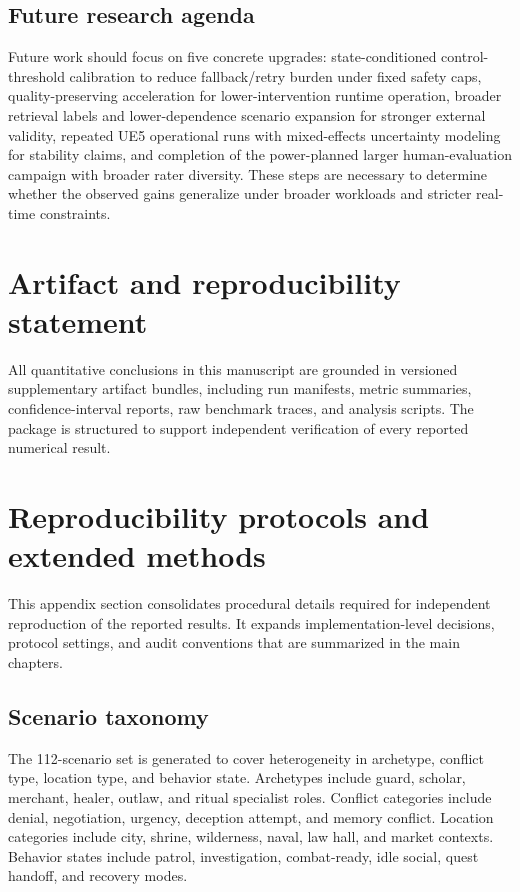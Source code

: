 ﻿\documentclass[a4paper,12pt]{article}
\renewcommand{\thesection}{\arabic{section}}
\begin{document}
\subsection{Future research agenda}
Future work should focus on five concrete upgrades: state-conditioned control-threshold calibration to reduce fallback/retry burden under fixed safety caps, quality-preserving acceleration for lower-intervention runtime operation, broader retrieval labels and lower-dependence scenario expansion for stronger external validity, repeated UE5 operational runs with mixed-effects uncertainty modeling for stability claims, and completion of the power-planned larger human-evaluation campaign with broader rater diversity. These steps are necessary to determine whether the observed gains generalize under broader workloads and stricter real-time constraints.

\section*{Artifact and reproducibility statement}
All quantitative conclusions in this manuscript are grounded in versioned supplementary artifact bundles, including run manifests, metric summaries, confidence-interval reports, raw benchmark traces, and analysis scripts. The package is structured to support independent verification of every reported numerical result.

\appendix
\titleformat{\section}{\bfseries\fontsize{15}{20}\selectfont}{Appendix \thesection:}{0.6em}{}

\section{Reproducibility protocols and extended methods}
This appendix section consolidates procedural details required for independent reproduction of the reported results. It expands implementation-level decisions, protocol settings, and audit conventions that are summarized in the main chapters.
\subsection{Scenario taxonomy}
The 112-scenario set is generated to cover heterogeneity in archetype, conflict type, location type, and behavior state. Archetypes include guard, scholar, merchant, healer, outlaw, and ritual specialist roles. Conflict categories include denial, negotiation, urgency, deception attempt, and memory conflict. Location categories include city, shrine, wilderness, naval, law hall, and market contexts. Behavior states include patrol, investigation, combat-ready, idle social, quest handoff, and recovery modes.
\end{document}
